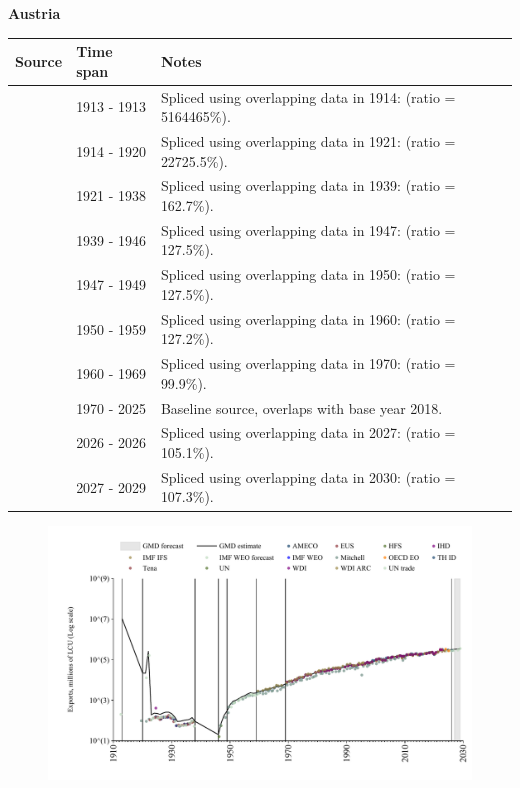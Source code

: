 \documentclass[12pt,a4paper,landscape]{article}
\begin{document}
\begin{adjustbox}{max totalsize={\paperwidth}{\paperheight},center}
\begin{minipage}[t][\textheight][t]{\textwidth}
\vspace*{0.5cm}
{}
\begin{center}
{\Large\bfseries Austria}
\end{center}
\vspace{0.5cm}
\begin{table}[H]
\centering
\small
\begin{tabular}{|l|l|l|}
\hline
\textbf{Source} & \textbf{Time span} & \textbf{Notes} \\
\hline
\rowcolor{white}\cite{UN_trade}& 1913 - 1913 &Spliced using overlapping data in 1914: (ratio = 5164465\%).\\
\rowcolor{lightgray}\cite{Mitchell}& 1914 - 1920 &Spliced using overlapping data in 1921: (ratio = 22725.5\%).\\
\rowcolor{white}\cite{UN_trade}& 1921 - 1938 &Spliced using overlapping data in 1939: (ratio = 162.7\%).\\
\rowcolor{lightgray}\cite{HFS}& 1939 - 1946 &Spliced using overlapping data in 1947: (ratio = 127.5\%).\\
\rowcolor{white}\cite{Mitchell}& 1947 - 1949 &Spliced using overlapping data in 1950: (ratio = 127.5\%).\\
\rowcolor{lightgray}\cite{UN_trade}& 1950 - 1959 &Spliced using overlapping data in 1960: (ratio = 127.2\%).\\
\rowcolor{white}\cite{AMECO}& 1960 - 1969 &Spliced using overlapping data in 1970: (ratio = 99.9\%).\\
\rowcolor{lightgray}\cite{OECD_EO}& 1970 - 2025 &Baseline source, overlaps with base year 2018.\\
\rowcolor{white}\cite{AMECO}& 2026 - 2026 &Spliced using overlapping data in 2027: (ratio = 105.1\%).\\
\rowcolor{lightgray}\cite{IMF_WEO_forecast}& 2027 - 2029 &Spliced using overlapping data in 2030: (ratio = 107.3\%).\\
\hline
\end{tabular}
\end{table}
\begin{figure}[H]
\centering
\includegraphics[width=\textwidth,height=0.6\textheight,keepaspectratio]{graphs/AUT_exports.pdf}

\end{figure}
\end{minipage}
\end{adjustbox}
\end{document}
